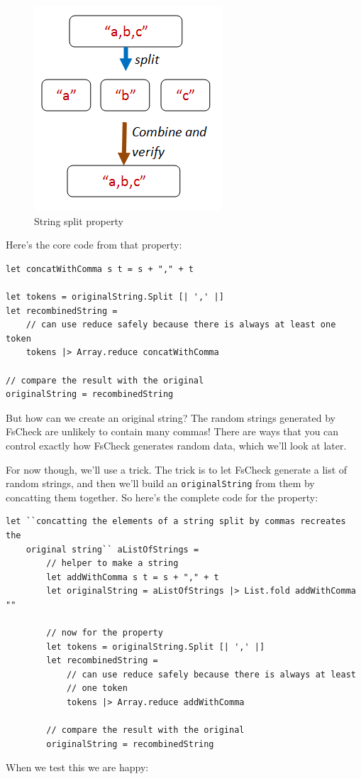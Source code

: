 \begin{figure}[htbp]
\centering
\includegraphics{pics/property_string_split.png}
\caption{String split property}
\end{figure}

Here's the core code from that property:

\begin{verbatim}
let concatWithComma s t = s + "," + t

let tokens = originalString.Split [| ',' |] 
let recombinedString = 
	// can use reduce safely because there is always at least one token
	tokens |> Array.reduce concatWithComma 

// compare the result with the original
originalString = recombinedString 
\end{verbatim}

But how can we create an original string? The random strings generated
by FsCheck are unlikely to contain many commas!
There are ways that you can control exactly how FsCheck generates random
data, which we'll look at later.

For now though, we'll use a trick. The trick is to let FsCheck generate
a list of random strings, and then we'll build an
\texttt{originalString} from them by concatting them together.
So here's the complete code for the property:

\begin{verbatim}
let ``concatting the elements of a string split by commas recreates the 
    original string`` aListOfStrings = 
        // helper to make a string
        let addWithComma s t = s + "," + t
        let originalString = aListOfStrings |> List.fold addWithComma ""
        
        // now for the property
        let tokens = originalString.Split [| ',' |] 
        let recombinedString = 
            // can use reduce safely because there is always at least 
            // one token
            tokens |> Array.reduce addWithComma 

        // compare the result with the original
        originalString = recombinedString 
\end{verbatim}
When we test this we are happy:

